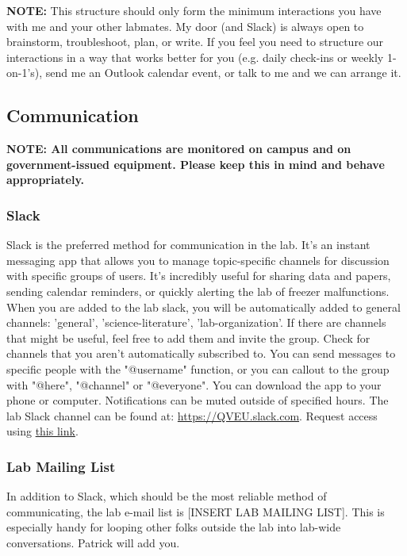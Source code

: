 \documentclass[10pt, letterpaper, twocolumn]{article} %
\begin{document}
{\bfseries NOTE:} This structure should only form the minimum interactions you have with me and your other labmates. My door (and Slack) is always open to brainstorm, troubleshoot, plan, or write. If you feel you need to structure our interactions in a way that works better for you (e.g. daily check-ins or weekly 1-on-1's), send me an Outlook calendar event, or talk to me and we can arrange it.

\subsection{Communication}
{\bfseries NOTE: All communications are monitored on campus and on government-issued equipment. Please keep this in mind and behave appropriately.}
\subsubsection{Slack}
Slack is the preferred method for communication in the lab. It's an instant messaging app that allows you to manage topic-specific channels for discussion with specific groups of users. It’s incredibly useful for sharing data and papers, sending calendar reminders, or quickly alerting the lab of freezer malfunctions. When you are added to the lab slack, you will be automatically added to general channels: 'general', 'science-literature', 'lab-organization'. If there are channels that might be useful, feel free to add them and invite the group. Check for channels that you aren't automatically subscribed to. You can send messages to specific people with the "@username" function, or you can callout to the group with "@here", "@channel" or "@everyone". You can download the app to your phone or computer. Notifications can be muted outside of specified hours. The lab Slack channel can be found at: \href{https://QVEU.slack.com}{https://QVEU.slack.com}. Request access using \href{https://join.slack.com/t/qveu/shared_invite/zt-sspu46d0-mJUV8OjwjOoJTaFyPKGlZg}{this link}.\newline

\subsubsection{Lab Mailing List}
In addition to Slack, which should be the most reliable method of communicating, the lab e-mail list is [INSERT LAB MAILING LIST]. This is especially handy for looping other folks outside the lab into lab-wide conversations. Patrick will add you.
\end{document}
